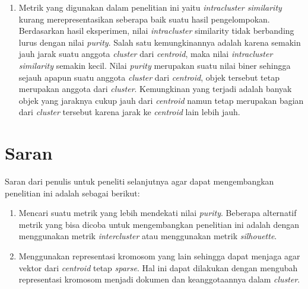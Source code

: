 \begin{enumerate}
	\item Metrik yang digunakan dalam penelitian ini yaitu \textit{intracluster similarity} kurang merepresentasikan seberapa baik suatu hasil pengelompokan. Berdasarkan hasil eksperimen, nilai \textit{intracluster} similarity tidak berbanding lurus dengan nilai \textit{purity}. Salah satu kemungkinannya adalah karena semakin jauh jarak suatu anggota \textit{cluster} dari \textit{centroid}, maka nilai \textit{intracluster similarity} semakin kecil. Nilai \textit{purity} merupakan suatu nilai biner sehingga sejauh apapun suatu anggota \textit{cluster} dari \textit{centroid}, objek tersebut tetap merupakan anggota dari \textit{cluster}. Kemungkinan yang terjadi adalah banyak objek yang jaraknya cukup jauh dari \textit{centroid} namun tetap merupakan bagian dari \textit{cluster} tersebut karena jarak ke \textit{centroid} lain lebih jauh.
\end{enumerate}

\section{Saran}
Saran dari penulis untuk peneliti selanjutnya agar dapat mengembangkan penelitian ini adalah sebagai berikut:

\begin{enumerate}
	\item Mencari suatu metrik yang lebih mendekati nilai \textit{purity}. Beberapa alternatif metrik yang bisa dicoba untuk mengembangkan penelitian ini adalah dengan menggunakan metrik \textit{intercluster} atau menggunakan metrik \textit{silhouette}.
	\item Menggunakan representasi kromosom yang lain sehingga dapat menjaga agar vektor dari \textit{centroid} tetap \textit{sparse}. Hal ini dapat dilakukan dengan mengubah representasi kromosom menjadi dokumen dan keanggotaannya dalam \textit{cluster}.
\end{enumerate}
